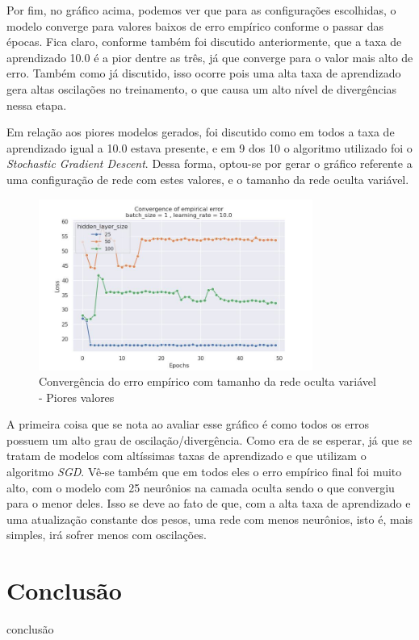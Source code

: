 \documentclass{article}
\begin{document}
Por fim, no gráfico acima, podemos ver que para as configurações escolhidas, o modelo converge para valores baixos de erro empírico conforme o passar das épocas.
Fica claro, conforme também foi discutido anteriormente, que a taxa de aprendizado 10.0 é a pior dentre as três, já que converge para o valor mais alto de erro. Também
como já discutido, isso ocorre pois uma alta taxa de aprendizado gera altas oscilações no treinamento, o que causa um alto nível de divergências nessa etapa.

Em relação aos piores modelos gerados, foi discutido como em todos a taxa de aprendizado igual a 10.0 estava presente, e em 9 dos 10 o algoritmo utilizado foi o \textit{Stochastic Gradient Descent}.
Dessa forma, optou-se por gerar o gráfico referente a uma configuração de rede com estes valores, e o tamanho da rede oculta variável.

\begin{figure}[H]
    \centering
    \includegraphics[width=0.8\textwidth]{images/empirical_error/hidden_layer_size_not_fixed_bad.jpg}
    \caption{Convergência do erro empírico com tamanho da rede oculta variável - Piores valores}
\end{figure}

A primeira coisa que se nota ao avaliar esse gráfico é como todos os erros possuem um alto grau de oscilação/divergência. Como era de se
esperar, já que se tratam de modelos com altíssimas taxas de aprendizado e que utilizam o algoritmo \textit{SGD}. Vê-se também
que em todos eles o erro empírico final foi muito alto, com o modelo com 25 neurônios na camada oculta sendo o que convergiu
para o menor deles. Isso se deve ao fato de que, com a alta taxa de aprendizado e uma atualização constante dos pesos, uma rede
com menos neurônios, isto é, mais simples, irá sofrer menos com oscilações.

\section{Conclusão}

conclusão
\end{document}

